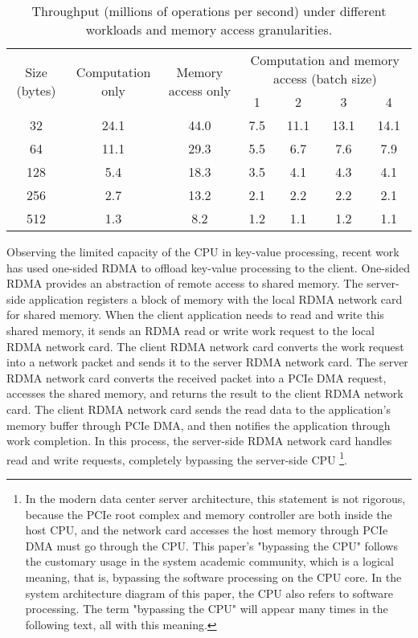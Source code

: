 \begin{table}[htbp]
	\small
	\centering
	\caption{Throughput (millions of operations per second) under different workloads and memory access granularities.}
	\begin{tabular}{|c|c|c|c|c|c|c|}
		\hline
		\multirow{2}{*}{Size (bytes)} & \multirow{2}{*}{Computation only} & \multirow{2}{*}{Memory access only} & \multicolumn{4}{c|}{Computation and memory access (batch size)} \\\cline{4-7} 
		&  & & 1 & 2 & 3 & 4 \\\hline
		32 & 24.1 & 44.0 & 7.5 & 11.1 & 13.1 & 14.1 \\\hline
		64 & 11.1 & 29.3 & 5.5 & 6.7 & 7.6 & 7.9 \\\hline
		128 & 5.4 & 18.3 & 3.5 & 4.1 & 4.3 & 4.1 \\\hline
		256 & 2.7 & 13.2 & 2.1 & 2.2 & 2.2 & 2.1 \\\hline
		512 & 1.3 & 8.2 & 1.2 & 1.1 & 1.2 & 1.1 \\\hline
	\end{tabular}
	\label{kvdirect:tab:kv-cpu-throughput}
\end{table}


Observing the limited capacity of the CPU in key-value processing, recent work has used one-sided RDMA to offload key-value processing to the client. One-sided RDMA provides an abstraction of remote access to shared memory. The server-side application registers a block of memory with the local RDMA network card for shared memory. When the client application needs to read and write this shared memory, it sends an RDMA read or write work request to the local RDMA network card. The client RDMA network card converts the work request into a network packet and sends it to the server RDMA network card. The server RDMA network card converts the received packet into a PCIe DMA request, accesses the shared memory, and returns the result to the client RDMA network card. The client RDMA network card sends the read data to the application's memory buffer through PCIe DMA, and then notifies the application through work completion. In this process, the server-side RDMA network card handles read and write requests, completely bypassing the server-side CPU \footnote{In the modern data center server architecture, this statement is not rigorous, because the PCIe root complex and memory controller are both inside the host CPU, and the network card accesses the host memory through PCIe DMA must go through the CPU. This paper's "bypassing the CPU" follows the customary usage in the system academic community, which is a logical meaning, that is, bypassing the software processing on the CPU core. In the system architecture diagram of this paper, the CPU also refers to software processing. The term "bypassing the CPU" will appear many times in the following text, all with this meaning.}.

